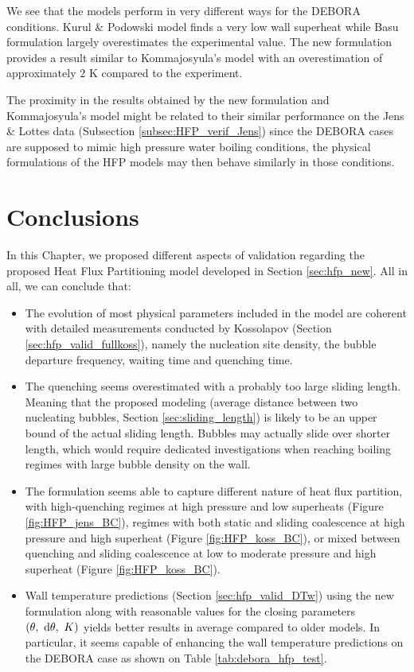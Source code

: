 We see that the models perform in very different ways for the DEBORA conditions. Kurul \& Podowski model finds a very low wall superheat while Basu \etal formulation largely overestimates the experimental value. The new formulation provides a result similar to Kommajosyula's model with an overestimation of approximately $2$ K compared to the experiment.

\begin{remark*}{}
The proximity in the results obtained by the new formulation and Kommajosyula's model might be related to their similar performance on the Jens \& Lottes data (Subsection \ref{subsec:HFP_verif_Jens}) since the DEBORA cases are supposed to mimic high pressure water boiling conditions, the physical formulations of the HFP models may then behave similarly in those conditions.
\end{remark*}


\section{Conclusions}

In this Chapter, we proposed different aspects of validation regarding the proposed Heat Flux Partitioning model developed in Section \ref{sec:hfp_new}. All in all, we can conclude that:

\begin{itemize}
\item The evolution of most physical parameters included in the model are coherent with detailed measurements conducted by Kossolapov \cite{kossolapov_experimental_2021} (Section \ref{sec:hfp_valid_fullkoss}), namely the nucleation site density, the bubble departure frequency, waiting time and quenching time.

\item The quenching seems overestimated with a probably too large sliding length. Meaning that the proposed modeling (\ie average distance between two nucleating bubbles, Section \ref{sec:sliding_length}) is likely to be an upper bound of the actual sliding length. Bubbles may actually slide over shorter length, which would require dedicated investigations when reaching boiling regimes with large bubble density on the wall.

\item The formulation seems able to capture different nature of heat flux partition, with high-quenching regimes at high pressure and low superheats (Figure \ref{fig:HFP_jens_BC}), regimes with both static and sliding coalescence at high pressure and high superheat (Figure \ref{fig:HFP_koss_BC}), or mixed between quenching and sliding coalescence at low to moderate pressure and high superheat (Figure \ref{fig:HFP_koss_BC}).

\item Wall temperature predictions (Section \ref{sec:hfp_valid_DTw}) using the new formulation along with reasonable values for the closing parameters $\left( \theta,\ \mathrm{d}\theta,\ K  \right)$ yields better results in average compared to older models. In particular, it seems capable of enhancing the wall temperature predictions on the DEBORA case as shown on Table \ref{tab:debora_hfp_test}.

\end{itemize}
